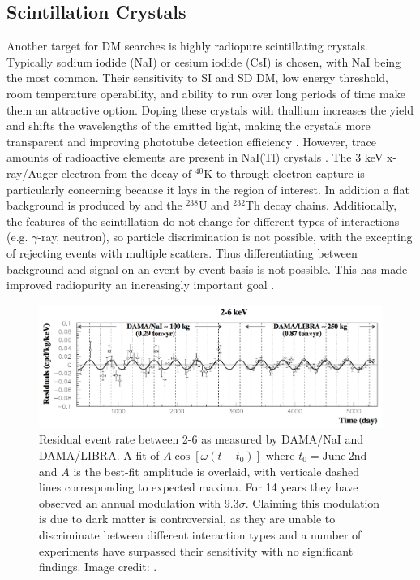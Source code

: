 
\subsection{Scintillation Crystals}
\label{subsec:crystals}
Another target for DM searches is highly radiopure scintillating crystals.  Typically sodium iodide (NaI) or cesium iodide (CsI) is
chosen, with NaI being the most common.  Their sensitivity to SI
and SD DM, low energy threshold, room temperature operability, and ability to run over long periods of time
make them an attractive option.  Doping these crystals with thallium increases the yield and shifts the wavelengths of the emitted light,
making the crystals
more transparent and improving phototube detection efficiency .  However, trace amounts of radioactive elements
are present in NaI(Tl) crystals .  The 3 keV x-ray/Auger electron from the decay of
$^{40}$K to  through electron capture is particularly concerning because it lays in the region of interest.  In addition a
flat background is produced by  and the $^{238}$U and $^{232}$Th decay chains.  Additionally, the features of the
scintillation
do not change for different types of interactions (e.g. $\gamma$-ray, neutron), so particle discrimination is not possible, with the
excepting of rejecting events with multiple scatters.  Thus differentiating between background and signal on an event by event basis is
not possible.  This has made improved radiopurity an increasingly important goal .

\begin{figure}
\centering
\includegraphics[width=\textwidth]{DAMAModulation}
\caption{Residual event rate between 2-6 \kevee as measured by DAMA/NaI and DAMA/LIBRA.  A fit of $A \cos [\omega (t - t_{0})]$ where
$t_{0} = \mathrm{June\ 2nd}$ and $A$ is the best-fit amplitude is overlaid, with verticale dashed lines corresponding to expected
maxima.  For 14 years they have observed an annual
modulation with $9.3\sigma$.  Claiming this modulation is due to dark matter is controversial, as they are unable to
discriminate between different interaction types and a number of experiments have surpassed their sensitivity with no significant
findings.  Image credit: .}
\label{fig:dama}
\end{figure}


